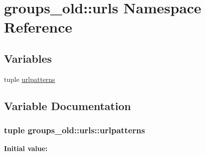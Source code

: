 \hypertarget{namespacegroups__old_1_1urls}{
\section{groups\_\-old::urls Namespace Reference}
\label{namespacegroups__old_1_1urls}
}
\subsection*{Variables}
\begin{DoxyCompactItemize}
\item 
tuple \hyperlink{namespacegroups__old_1_1urls_a8591c24d5c12eb136eb5b64c3ab4873f}{urlpatterns}
\end{DoxyCompactItemize}


\subsection{Variable Documentation}
\hypertarget{namespacegroups__old_1_1urls_a8591c24d5c12eb136eb5b64c3ab4873f}{
\subsubsection[{urlpatterns}]{\setlength{\rightskip}{0pt plus 5cm}tuple {\bf groups\_\-old::urls::urlpatterns}}}
\label{namespacegroups__old_1_1urls_a8591c24d5c12eb136eb5b64c3ab4873f}
{\bfseries Initial value:}

